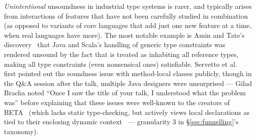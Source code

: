 \emph{Unintentional} unsoundness in industrial type systems is rarer, and typically arises from interactions of features that have not been carefully studied in combination
(as opposed to variants of core languages that add just one new feature at a time, when real languages have more).
The most notable example is Amin and Tate's discovery~\cite{amin2016java} that Java and Scala's handling of generic type constraints
was rendered unsound by the fact that \Q@null@ is treated as inhabiting all reference types, making all
type constraints (even nonsensical ones) satisfiable.
Servetto et al.~\cite{unsound_presentation} first pointed out the soundness issue with method-local classes publicly, though in the
Q\&A session after the talk, multiple Java designers were unsurprised --- Gilad Bracha noted ``Once I saw the title of your talk, I understood what the problem was''
before explaining that these issues were well-known to the creators of \textsc{BETA}~\cite{kristensen2007and} (which lacks static type-checking, but actively views local declarations as tied to their enclosing dynamic context~\cite{kristensen1983abstraction} --- granularity 3 in \S\ref{sec:funnelling}'s taxonomy).



%
%
%
%
%
%
